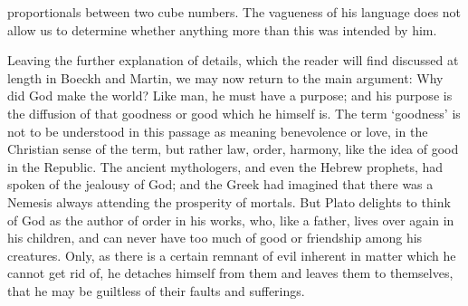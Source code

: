 \documentclass[11pt,letter]{article}
\begin{document}
proportionals between two cube numbers. The vagueness of his language does not allow us to determine whether anything more than this was intended by him.

\par  Leaving the further explanation of details, which the reader will find discussed at length in Boeckh and Martin, we may now return to the main argument: Why did God make the world? Like man, he must have a purpose; and his purpose is the diffusion of that goodness or good which he himself is. The term ‘goodness’ is not to be understood in this passage as meaning benevolence or love, in the Christian sense of the term, but rather law, order, harmony, like the idea of good in the Republic. The ancient mythologers, and even the Hebrew prophets, had spoken of the jealousy of God; and the Greek had imagined that there was a Nemesis always attending the prosperity of mortals. But Plato delights to think of God as the author of order in his works, who, like a father, lives over again in his children, and can never have too much of good or friendship among his creatures. Only, as there is a certain remnant of evil inherent in matter which he cannot get rid of, he detaches himself from them and leaves them to themselves, that he may be guiltless of their faults and sufferings.
\end{document}
